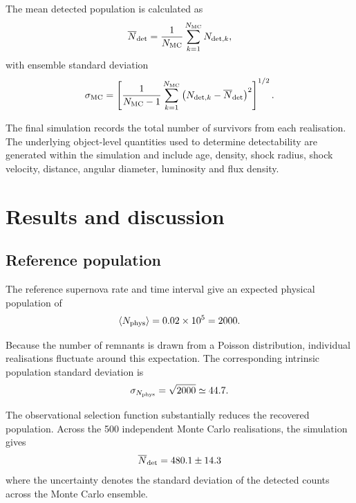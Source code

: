 \documentclass[
aps,
prd,
reprint,
superscriptaddress,
nofootinbib
]{revtex4-2}
\begin{document}
	The mean detected population is calculated as
	\begin{equation}
		\overline{N}_{\rm det}
		=
		\frac{1}{N_{\rm MC}}
		\sum_{k=1}^{N_{\rm MC}}
		N_{{\rm det},k},
		\label{eq:mean}
	\end{equation}
	with ensemble standard deviation
	\begin{equation}
		\sigma_{\rm MC}
		=
		\left[
		\frac{1}{N_{\rm MC}-1}
		\sum_{k=1}^{N_{\rm MC}}
		\left(
		N_{{\rm det},k}-\overline{N}_{\rm det}
		\right)^2
		\right]^{1/2}.
		\label{eq:std}
	\end{equation}
	
	The final simulation records the total number of survivors from each
	realisation.  The underlying object-level quantities used to determine
	detectability are generated within the simulation and include age, density,
	shock radius, shock velocity, distance, angular diameter, luminosity and
	flux density.
	
	\section{Results and discussion}
	\label{sec:results}
	
	\subsection{Reference population}
	
	The reference supernova rate and time interval give an expected physical
	population of
	\begin{equation}
		\langle N_{\rm phys}\rangle
		=
		0.02\times10^5
		=
		2000.
	\end{equation}
	
	Because the number of remnants is drawn from a Poisson distribution, individual
	realisations fluctuate around this expectation.  The corresponding intrinsic
	population standard deviation is
	\begin{equation}
		\sigma_{N_{\rm phys}}
		=
		\sqrt{2000}
		\simeq44.7.
	\end{equation}
	
	The observational selection function substantially reduces the recovered
	population.  Across the 500 independent Monte Carlo realisations, the simulation
	gives
	\begin{equation}
			\overline{N}_{\rm det}=480.1\pm14.3
		\label{eq:result}
	\end{equation}
	where the uncertainty denotes the standard deviation of the detected counts
	across the Monte Carlo ensemble.
	
\end{document}
